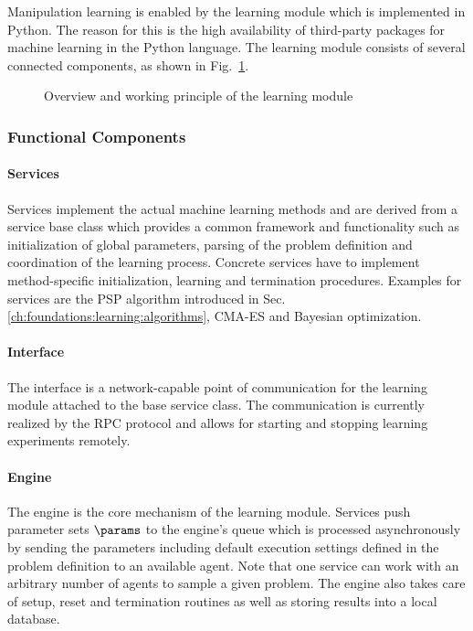 Manipulation learning is enabled by the learning module which is implemented in Python.
The reason for this is the high availability of third-party packages for machine learning in the Python language.
The learning module consists of several connected components, as shown in Fig.~\ref{fig:architecture:mios:learning}.

\begin{figure}[ht!]
\begin{center}

\caption{Overview and working principle of the learning module}
\label{fig:architecture:mios:learning}
\end{center}
\end{figure}

\subsubsection{Functional Components}

\paragraph{Services}

Services implement the actual machine learning methods and are derived from a service base class which provides a common framework and functionality such as initialization of global parameters, parsing of the problem definition and coordination of the learning process.
Concrete services have to implement method-specific initialization, learning and termination procedures.
Examples for services are the PSP algorithm introduced in Sec. \ref{ch:foundations:learning:algorithms}, CMA-ES and Bayesian optimization.

\paragraph{Interface}

The interface is a network-capable point of communication for the learning module attached to the base service class.
The communication is currently realized by the RPC protocol and allows for starting and stopping learning experiments remotely.

\paragraph{Engine}

The engine is the core mechanism of the learning module.
Services push parameter sets $\params$ to the engine's queue which is processed asynchronously by sending the parameters including default execution settings defined in the problem definition to an available agent.
Note that one service can work with an arbitrary number of agents to sample a given problem.
The engine also takes care of setup, reset and termination routines as well as storing results into a local database.

